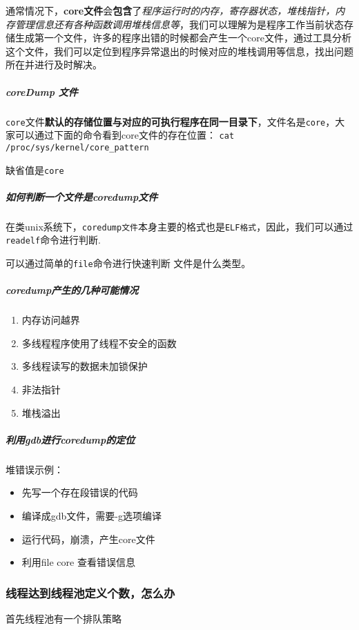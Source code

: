 \documentclass[UTF8,a4paper,8pt]{ctexart}
\begin{document}
				通常情况下，\textbf{core文件}会\textbf{包含}了\textit{程序运行时的内存，寄存器状态，堆栈指针，内存管理信息还有各种函数调用堆栈信息等}，我们可以理解为是程序工作当前状态存储生成第一个文件，许多的程序出错的时候都会产生一个core文件，通过工具分析这个文件，我们可以定位到程序异常退出的时候对应的堆栈调用等信息，找出问题所在并进行及时解决。
			
			\subparagraph{coreDump 文件}
				 \verb|core|文件\textbf{默认的存储位置与对应的可执行程序在同一目录下}，文件名是\verb|core|，大家可以通过下面的命令看到core文件的存在位置：
				 \verb|cat  /proc/sys/kernel/core_pattern|
				 
				 缺省值是\verb|core|

			\subparagraph{如何判断一个文件是coredump文件}
				在类unix系统下，\verb|coredump文件|本身主要的格式也是\verb|ELF格式|，因此，我们可以通过\verb|readelf|命令进行判断.
				
				可以通过简单的\verb|file|命令进行快速判断 文件是什么类型。
			
			\subparagraph{coredump产生的几种可能情况}
				\begin{enumerate}[itemindent = 1em]
					\item 内存访问越界
					\item 多线程程序使用了线程不安全的函数
					\item 多线程读写的数据未加锁保护
					\item 非法指针
					\item 堆栈溢出
				\end{enumerate}
			\subparagraph{利用gdb进行coredump的定位}
			
				堆错误示例：
				\begin{itemize}
					\item 先写一个存在段错误的代码
					\item 编译成gdb文件，需要-g选项编译
					\item 运行代码，崩溃，产生core文件
					\item 利用file core 查看错误信息
				\end{itemize}
			
		\subsubsection{线程达到线程池定义个数，怎么办}
			首先线程池有一个排队策略
			
\end{document}
